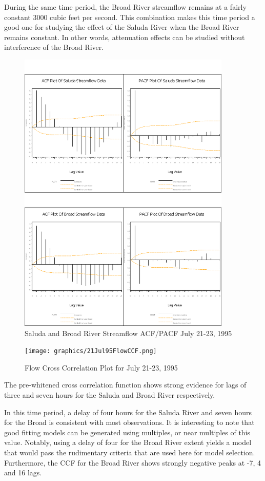 \documentclass[12pt]{report}
\begin{document}
During the same time period, the Broad River streamflow remains at
a fairly constant 3000 cubic feet per second. This combination
makes this time period a good one for studying the effect of the
Saluda River when the Broad River remains constant. In other
words, attenuation effects can be studied without interference of
the Broad River.
\begin{figure}[h]
\centering\includegraphics[width=4in]{prodgraph/23Julinput.png}
\centering\caption{Saluda and Broad River Streamflow ACF/PACF July
21-23, 1995}\label{fig:julfsalapcf}
\end{figure}

\begin{figure}[h]
\centering\texttt{[image: graphics/21Jul95FlowCCF.png]}
\centering\caption{Flow Cross Correlation Plot for July 21-23,
1995}
\end{figure}
The pre-whitened cross correlation function shows strong evidence
for lags of three and seven hours for the Saluda and Broad River
respectively.

In this time period, a delay of four hours for the Saluda River
and seven hours for the Broad is consistent with most
observations.  It is interesting to note that good fitting models
can be generated using multiples, or near multiples of this value.
Notably, using a delay of four for the Broad River extent yields a
model that would pass the rudimentary criteria that are used here
for model selection. Furthermore, the CCF for the Broad River
shows strongly negative peaks at -7, 4 and 16 lags.
\end{document}
